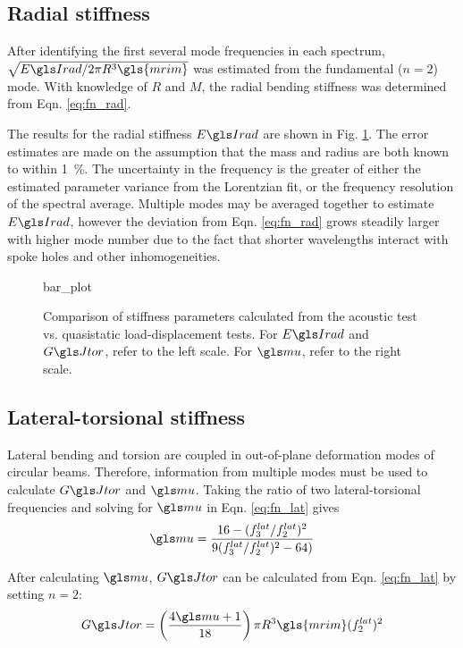 \documentclass[../thesis.tex]{subfiles}
\begin{document}
\subsection{Radial stiffness}

After identifying the first several mode frequencies in each spectrum, $\sqrt{\EIr/2\pi R^3 \gls{mrim}}$ was estimated from the fundamental ($n=2$) mode. With knowledge of $R$ and $M$, the radial bending stiffness was determined from Eqn. \eqref{eq:fn_rad}.

The results for the radial stiffness $\EIr$ are shown in Fig. \ref{fig:bar}. The error estimates are made on the assumption that the mass and radius are both known to within \SI{1}{\percent}. The uncertainty in the frequency is the greater of either the estimated parameter variance from the Lorentzian fit, or the frequency resolution of the spectral average. Multiple modes may be averaged together to estimate $\EIr$, however the deviation from Eqn. \eqref{eq:fn_rad} grows steadily larger with higher mode number due to the fact that shorter wavelengths interact with spoke holes and other inhomogeneities.

\begin{figure}
{bar_plot}
\caption{Comparison of stiffness parameters calculated from the acoustic test vs. quasistatic load-displacement tests. For $\EIr$ and $\GJ$, refer to the left scale. For $\m$, refer to the right scale.}
\label{fig:bar}
\end{figure}

\subsection{Lateral-torsional stiffness}

Lateral bending and torsion are coupled in out-of-plane deformation modes of circular beams. Therefore, information from multiple modes must be used to calculate $\GJ$ and $\m$. Taking the ratio of two lateral-torsional frequencies and solving for $\m$ in Eqn. \eqref{eq:fn_lat} gives
  \begin{equation}\label{eq:mu}
  \m = \frac{16 - (f_3^{lat}/f_2^{lat})^2}{9(f_3^{lat}/f_2^{lat})^2 - 64)}
  \end{equation}

After calculating $\m$, $\GJ$ can be calculated from Eqn. \eqref{eq:fn_lat} by setting $n=2$:
  \begin{equation}\label{eq:GJ}
  \GJ = \left(\frac{4\m + 1}{18} \right ) \pi R^3 \gls{mrim} (f_2^{lat})^2
  \end{equation}
\end{document}
